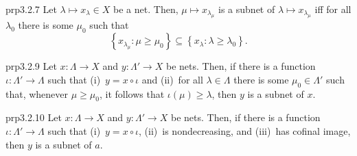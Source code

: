 \begin{prp}{}{prp3.2.7}
Let $\lambda \mapsto x_{\lambda}\in X$ be a net.  Then, $\mu \mapsto x_{\lambda _{\mu}}$ is a subnet of $\lambda \mapsto x_{\lambda _{\mu}}$ iff for all $\lambda _0$ there is some $\mu _0$ such that
\begin{equation}
\left\{ x_{\lambda _{\mu}}:\mu \geq \mu _0\right\} \subseteq \left\{ x_{\lambda}:\lambda \geq \lambda _0\right\} .
\end{equation}
\end{prp}
\begin{prp}{}{prp3.2.9}
Let $x\colon \Lambda \rightarrow X$ and $y\colon \Lambda '\rightarrow X$ be nets.  Then, if there is a function $\iota \colon \Lambda '\rightarrow \Lambda$ such that (i)~$y=x\circ \iota$ and (ii)~for all $\lambda \in \Lambda$ there is some $\mu _0\in \Lambda '$ such that, whenever $\mu \geq \mu _0$, it follows that $\iota (\mu )\geq \lambda$, then $y$ is a subnet of $x$.
\end{prp}
\begin{prp}{}{prp3.2.10}
Let $x\colon \Lambda \rightarrow X$ and $y\colon \Lambda '\rightarrow X$ be nets.  Then, if there is a function $\iota \colon \Lambda '\rightarrow \Lambda$ such that (i)~$y=x\circ \iota$, (ii)~is nondecreasing, and (iii)~has cofinal image, then $y$ is a subnet of $a$.
\end{prp}
